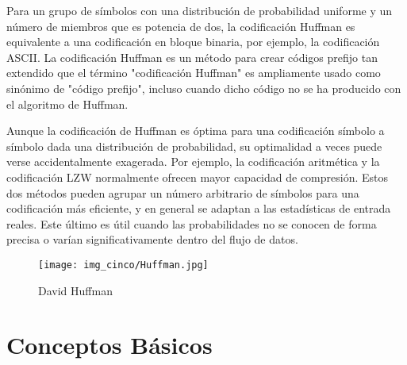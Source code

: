 \documentclass[12pt,twoside]{article}
\begin{document}
Para un grupo de símbolos con una distribución de probabilidad uniforme y un número de miembros que es potencia de dos, la codificación Huffman es equivalente a una codificación en bloque binaria, por ejemplo, la codificación ASCII. La codificación Huffman es un método para crear códigos prefijo tan extendido que el término "codificación Huffman" es ampliamente usado como sinónimo de "código prefijo", incluso cuando dicho código no se ha producido con el algoritmo de Huffman.

Aunque la codificación de Huffman es óptima para una codificación símbolo a símbolo dada una distribución de probabilidad, su optimalidad a veces puede verse accidentalmente exagerada. Por ejemplo, la codificación aritmética y la codificación LZW normalmente ofrecen mayor capacidad de compresión. Estos dos métodos pueden agrupar un número arbitrario de símbolos para una codificación más eficiente, y en general se adaptan a las estadísticas de entrada reales. Este último es útil cuando las probabilidades no se conocen de forma precisa o varían significativamente dentro del flujo de datos. \cite{pal}
\vspace{5 mm}
\begin{figure}[H]
\centering
\texttt{[image: img\_cinco/Huffman.jpg]}
\caption{David Huffman}
\end{figure}

\section{Conceptos Básicos}
\end{document}
